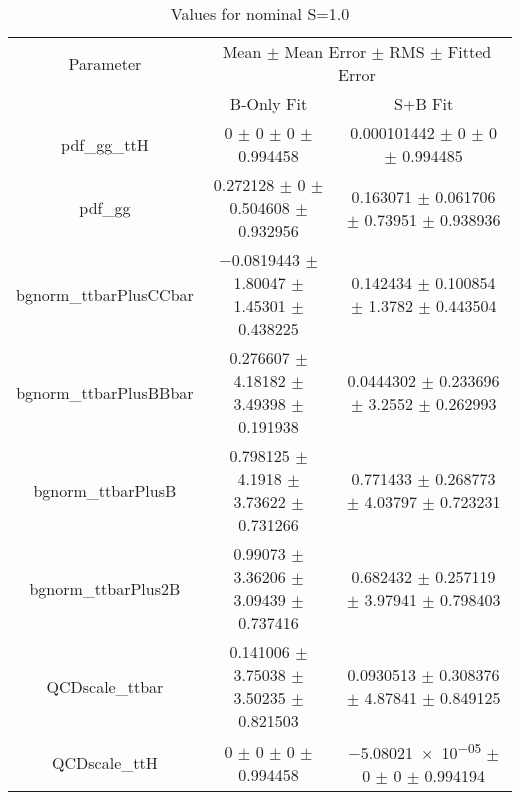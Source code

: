 \begin{table}
\centering
\caption{Values for nominal S=1.0}
\begin{tabular}{ccc}
\toprule
Parameter & \multicolumn{2}{c}{Mean $\pm$ Mean Error $\pm$ RMS $\pm$ Fitted Error}\\
 & B-Only Fit & S+B Fit\\
\midrule
pdf\_gg\_ttH & \num{0} $\pm$ \num{0} $\pm$ \num{0} $\pm$ \num{0.994458} & \num{0.000101442} $\pm$ \num{0} $\pm$ \num{0} $\pm$ \num{0.994485}\\
pdf\_gg & \num{0.272128} $\pm$ \num{0} $\pm$ \num{0.504608} $\pm$ \num{0.932956} & \num{0.163071} $\pm$ \num{0.061706} $\pm$ \num{0.73951} $\pm$ \num{0.938936}\\
bgnorm\_ttbarPlusCCbar & \num{-0.0819443} $\pm$ \num{1.80047} $\pm$ \num{1.45301} $\pm$ \num{0.438225} & \num{0.142434} $\pm$ \num{0.100854} $\pm$ \num{1.3782} $\pm$ \num{0.443504}\\
bgnorm\_ttbarPlusBBbar & \num{0.276607} $\pm$ \num{4.18182} $\pm$ \num{3.49398} $\pm$ \num{0.191938} & \num{0.0444302} $\pm$ \num{0.233696} $\pm$ \num{3.2552} $\pm$ \num{0.262993}\\
bgnorm\_ttbarPlusB & \num{0.798125} $\pm$ \num{4.1918} $\pm$ \num{3.73622} $\pm$ \num{0.731266} & \num{0.771433} $\pm$ \num{0.268773} $\pm$ \num{4.03797} $\pm$ \num{0.723231}\\
bgnorm\_ttbarPlus2B & \num{0.99073} $\pm$ \num{3.36206} $\pm$ \num{3.09439} $\pm$ \num{0.737416} & \num{0.682432} $\pm$ \num{0.257119} $\pm$ \num{3.97941} $\pm$ \num{0.798403}\\
QCDscale\_ttbar & \num{0.141006} $\pm$ \num{3.75038} $\pm$ \num{3.50235} $\pm$ \num{0.821503} & \num{0.0930513} $\pm$ \num{0.308376} $\pm$ \num{4.87841} $\pm$ \num{0.849125}\\
QCDscale\_ttH & \num{0} $\pm$ \num{0} $\pm$ \num{0} $\pm$ \num{0.994458} & \num{-5.08021e-05} $\pm$ \num{0} $\pm$ \num{0} $\pm$ \num{0.994194}\\
\bottomrule
\end{tabular}
\end{table}